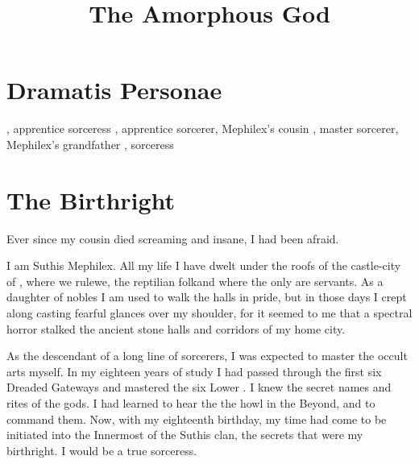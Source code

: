 \documentclass
  [a4paper,
   12pt,
   oneside
  ]%
  {article}
\title{The Amorphous God}
\begin{document}
  \stuffatthebeginning
  \setcounter{page}{1}















\section*{Dramatis Personae}
\begin{dramatispersonae}
  , 
    apprentice sorceress
  , 
    apprentice sorcerer, Mephilex's cousin
  , 
    master sorcerer, Mephilex's grandfather
  , 
    sorceress
\end{dramatispersonae}















\section{The Birthright}
Ever since my cousin died screaming and insane, I had been afraid. 

I am Suthis Mephilex. 
All my life I have dwelt under the roofs of the castle-city of \Yormis, where we \scathae rule\dash we, the reptilian folk\dash and where the only \humans are servants.%
\index{\human}%
\index{\scatha}%
\index{\Yormis}
As a daughter of nobles I am used to walk the halls in pride, but in those days I crept along casting fearful glances over my shoulder, for it seemed to me that a spectral horror stalked the ancient stone halls and corridors of my home city. 

As the descendant of a long line of \rethyax sorcerers, I was expected to master the occult arts myself. 
In my eighteen years of study I had passed through the first six Dreaded Gateways and mastered the six Lower \Arcana. 
I knew the secret names and rites of the gods. 
I had learned to hear the the \daemons howl in the Beyond, and to command them.%
\index{\daemon}
Now, with my eighteenth birthday, my time had come to be initiated into the Innermost \Arcana of the Suthis clan, the secrets that were my birthright. 
I would be a true \rethyax sorceress.
\end{document}
